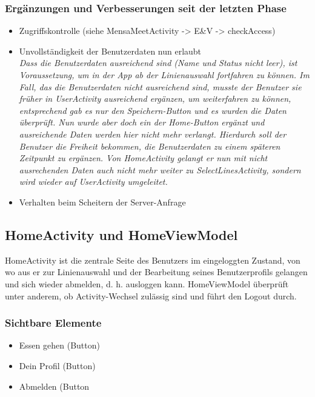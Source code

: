 \documentclass[a4paper]{scrreprt}
\begin{document}
\subsubsection{Ergänzungen und Verbesserungen seit der letzten Phase}

\begin{itemize}
\item Zugriffskontrolle (siehe MensaMeetActivity -> E\&V -> checkAccess)
\item Unvollständigkeit der Benutzerdaten nun erlaubt \\
\textit{Dass die Benutzerdaten ausreichend sind (Name und Status nicht leer), ist Voraussetzung, um in der App ab der Linienauswahl fortfahren zu können. Im Fall, das die Benutzerdaten nicht ausreichend sind, musste der Benutzer sie früher in UserActivity ausreichend ergänzen, um weiterfahren zu können, entsprechend gab es nur den Speichern-Button und es wurden die Daten überprüft. Nun wurde aber doch ein der Home-Button ergänzt und ausreichende Daten werden hier nicht mehr verlangt. Hierdurch soll der Benutzer die Freiheit bekommen, die Benutzerdaten zu einem späteren Zeitpunkt zu ergänzen. Von HomeActivity gelangt er nun mit nicht ausrechenden Daten auch nicht mehr weiter zu SelectLinesActivity, sondern wird wieder auf UserActivity umgeleitet. }
\item Verhalten beim Scheitern der Server-Anfrage
\end{itemize}

\subsection{HomeActivity und HomeViewModel}
HomeActivity ist die zentrale Seite des Benutzers im eingeloggten Zustand, von wo aus er zur Linienauswahl und der Bearbeitung seines Benutzerprofils gelangen und sich wieder abmelden, d. h. ausloggen kann. HomeViewModel überprüft unter anderem, ob Activity-Wechsel zulässig sind und führt den Logout durch.

\subsubsection{Sichtbare Elemente}

\begin{itemize}
\item Essen gehen (Button)
\item Dein Profil (Button)
\item Abmelden (Button
\end{itemize}
\end{document}
